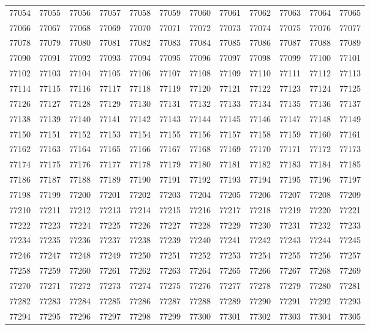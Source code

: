 \begin{center}
\begin{longtable}{llllllllllll}
77054 &77055 &77056 &77057 &77058 &77059 &77060 &77061 &77062 &77063 &77064 &77065 \\
77066 &77067 &77068 &77069 &77070 &77071 &77072 &77073 &77074 &77075 &77076 &77077 \\
77078 &77079 &77080 &77081 &77082 &77083 &77084 &77085 &77086 &77087 &77088 &77089 \\
77090 &77091 &77092 &77093 &77094 &77095 &77096 &77097 &77098 &77099 &77100 &77101 \\
77102 &77103 &77104 &77105 &77106 &77107 &77108 &77109 &77110 &77111 &77112 &77113 \\
77114 &77115 &77116 &77117 &77118 &77119 &77120 &77121 &77122 &77123 &77124 &77125 \\
77126 &77127 &77128 &77129 &77130 &77131 &77132 &77133 &77134 &77135 &77136 &77137 \\
77138 &77139 &77140 &77141 &77142 &77143 &77144 &77145 &77146 &77147 &77148 &77149 \\
77150 &77151 &77152 &77153 &77154 &77155 &77156 &77157 &77158 &77159 &77160 &77161 \\
77162 &77163 &77164 &77165 &77166 &77167 &77168 &77169 &77170 &77171 &77172 &77173 \\
77174 &77175 &77176 &77177 &77178 &77179 &77180 &77181 &77182 &77183 &77184 &77185 \\
77186 &77187 &77188 &77189 &77190 &77191 &77192 &77193 &77194 &77195 &77196 &77197 \\
77198 &77199 &77200 &77201 &77202 &77203 &77204 &77205 &77206 &77207 &77208 &77209 \\
77210 &77211 &77212 &77213 &77214 &77215 &77216 &77217 &77218 &77219 &77220 &77221 \\
77222 &77223 &77224 &77225 &77226 &77227 &77228 &77229 &77230 &77231 &77232 &77233 \\
77234 &77235 &77236 &77237 &77238 &77239 &77240 &77241 &77242 &77243 &77244 &77245 \\
77246 &77247 &77248 &77249 &77250 &77251 &77252 &77253 &77254 &77255 &77256 &77257 \\
77258 &77259 &77260 &77261 &77262 &77263 &77264 &77265 &77266 &77267 &77268 &77269 \\
77270 &77271 &77272 &77273 &77274 &77275 &77276 &77277 &77278 &77279 &77280 &77281 \\
77282 &77283 &77284 &77285 &77286 &77287 &77288 &77289 &77290 &77291 &77292 &77293 \\
77294 &77295 &77296 &77297 &77298 &77299 &77300 &77301 &77302 &77303 &77304 &77305 \\

\end{longtable}
\end{center}
